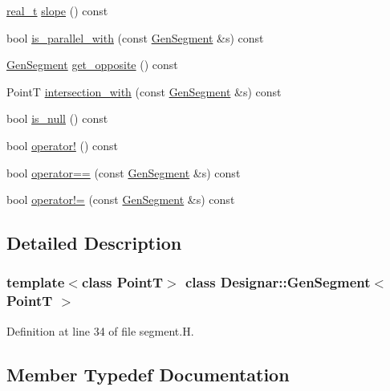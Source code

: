 \begin{DoxyCompactItemize}
\item 
\hyperlink{namespace_designar_aca2c32af26808dbec1f3a3071fad25ce}{real\+\_\+t} \hyperlink{class_designar_1_1_gen_segment_a02652b0274b3b597fb588d83d424b4bd}{slope} () const
\item 
bool \hyperlink{class_designar_1_1_gen_segment_ad599fb23aec1fda6432c984d7e261e53}{is\+\_\+parallel\+\_\+with} (const \hyperlink{class_designar_1_1_gen_segment}{Gen\+Segment} \&s) const
\item 
\hyperlink{class_designar_1_1_gen_segment}{Gen\+Segment} \hyperlink{class_designar_1_1_gen_segment_a0be16262e7398c8197b630d79cc90323}{get\+\_\+opposite} () const
\item 
PointT \hyperlink{class_designar_1_1_gen_segment_a50669847e6727a598ad75ea8b2339852}{intersection\+\_\+with} (const \hyperlink{class_designar_1_1_gen_segment}{Gen\+Segment} \&s) const
\item 
bool \hyperlink{class_designar_1_1_gen_segment_a812f6f7754064269eef82abc6091b818}{is\+\_\+null} () const
\item 
bool \hyperlink{class_designar_1_1_gen_segment_a49f01b575b3813da44a68e4565d99994}{operator!} () const
\item 
bool \hyperlink{class_designar_1_1_gen_segment_a2e6b2f583c4323af75351aef09528a7a}{operator==} (const \hyperlink{class_designar_1_1_gen_segment}{Gen\+Segment} \&s) const
\item 
bool \hyperlink{class_designar_1_1_gen_segment_a449cfcd9f6f6ac5d013e29ae572190c4}{operator!=} (const \hyperlink{class_designar_1_1_gen_segment}{Gen\+Segment} \&s) const
\end{DoxyCompactItemize}


\subsection{Detailed Description}
\subsubsection*{template$<$class PointT$>$\newline
class Designar\+::\+Gen\+Segment$<$ Point\+T $>$}



Definition at line 34 of file segment.\+H.



\subsection{Member Typedef Documentation}
\mbox{\label{class_designar_1_1_gen_segment_a411a0e6d28251be878c23ad4dbec71bb}} 
